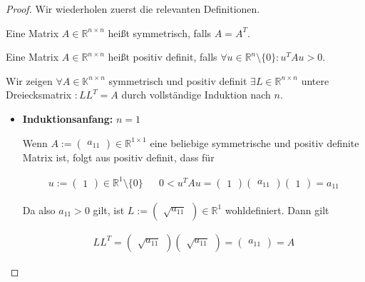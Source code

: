 \documentclass[]{article}
\begin{document}
\begin{proof}
	Wir wiederholen zuerst die relevanten Definitionen.
	
	Eine Matrix $A \in \mathbb{R}^{n\times n}$ heißt symmetrisch, falls $A = A^T$.
	
	Eine Matrix $A \in \mathbb{R}^{n\times n}$ heißt positiv definit, falls $\forall u \in \mathbb{R}^n\setminus\{0\}: u^T A u > 0$.
	
	Wir zeigen $\forall A \in \mathbb{K}^{n\times n}$ symmetrisch und positiv definit $\exists L \in \mathbb{R}^{n\times n}$ untere Dreiecksmatrix $: LL^T=A$ durch vollständige Induktion nach $n$.
	
	\begin{itemize}
		\item \textbf{Induktionsanfang:} $n=1$
		
		Wenn $A := \begin{pmatrix}
			a_{11}
		\end{pmatrix} \in \mathbb{R}^{1\times 1}$ eine beliebige symmetrische und positiv definite Matrix ist, folgt aus positiv definit, dass für
	
		\begin{align*}
			u := \begin{pmatrix}
				1
			\end{pmatrix} \in \mathbb{R}^1 \setminus\{0\} && 0 < u^TAu = \begin{pmatrix}
				1
			\end{pmatrix} \begin{pmatrix}
				a_{11}
			\end{pmatrix} \begin{pmatrix}
				1
			\end{pmatrix} = a_{11}
		\end{align*}
	
		Da also $a_{11} > 0$ gilt, ist $L := \begin{pmatrix}
			\sqrt{a_{11}}
		\end{pmatrix} \in \mathbb{R}^{1}$ wohldefiniert. Dann gilt
	
		\begin{align*}
			LL^T = \begin{pmatrix}
				\sqrt{a_{11}}
			\end{pmatrix} \begin{pmatrix}
				\sqrt{a_{11}}
			\end{pmatrix} = \begin{pmatrix}
				a_{11}
			\end{pmatrix} = A
		\end{align*}
	

\end{itemize}
\end{proof}
\end{document}
